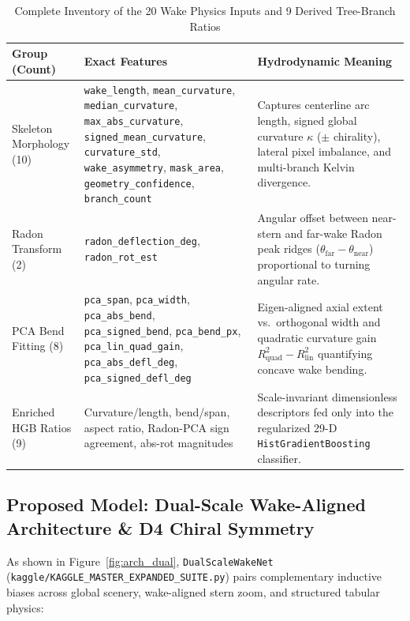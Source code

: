 \documentclass[11pt,a4paper]{article}
\begin{document}
\begin{table}[H]
\centering
\caption{Complete Inventory of the 20 Wake Physics Inputs and 9 Derived Tree-Branch Ratios}
\label{tab:physics_20}
{\footnotesize
\begin{tabularx}{\textwidth}{|p{2.7cm}|p{5.6cm}|X|}
\hline
\rowcolor{ruetgray}
\textbf{Group (Count)} & \textbf{Exact Features} & \textbf{Hydrodynamic Meaning} \\ \hline
Skeleton Morphology (10) & \texttt{wake\_length}, \texttt{mean\_curvature}, \texttt{median\_curvature}, \texttt{max\_abs\_curvature}, \texttt{signed\_mean\_curvature}, \texttt{curvature\_std}, \texttt{wake\_asymmetry}, \texttt{mask\_area}, \texttt{geometry\_confidence}, \texttt{branch\_count} & Captures centerline arc length, signed global curvature $\kappa$ ($\pm$ chirality), lateral pixel imbalance, and multi-branch Kelvin divergence. \\ \hline
Radon Transform (2) & \texttt{radon\_deflection\_deg}, \texttt{radon\_rot\_est} & Angular offset between near-stern and far-wake Radon peak ridges ($\theta_{\text{far}} - \theta_{\text{near}}$) proportional to turning angular rate. \\ \hline
PCA Bend Fitting (8) & \texttt{pca\_span}, \texttt{pca\_width}, \texttt{pca\_abs\_bend}, \texttt{pca\_signed\_bend}, \texttt{pca\_bend\_px}, \texttt{pca\_lin\_quad\_gain}, \texttt{pca\_abs\_defl\_deg}, \texttt{pca\_signed\_defl\_deg} & Eigen-aligned axial extent vs.\ orthogonal width and quadratic curvature gain $R^2_{\text{quad}} - R^2_{\text{lin}}$ quantifying concave wake bending. \\ \hline
Enriched HGB Ratios (9) & Curvature/length, bend/span, aspect ratio, Radon-PCA sign agreement, abs-rot magnitudes & Scale-invariant dimensionless descriptors fed only into the regularized 29-D \texttt{HistGradientBoosting} classifier. \\ \hline
\end{tabularx}
}
\end{table}

\subsection{Proposed Model: Dual-Scale Wake-Aligned Architecture \& D4 Chiral Symmetry}
As shown in Figure~\ref{fig:arch_dual}, \texttt{DualScaleWakeNet} (\texttt{kaggle/KAGGLE\_MASTER\_EXPANDED\_SUITE.py}) pairs complementary inductive biases across global scenery, wake-aligned stern zoom, and structured tabular physics:
\end{document}
